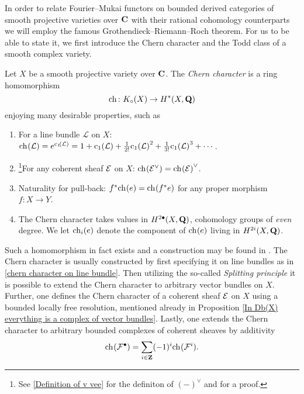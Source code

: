 In order to relate Fourier--Mukai functors on bounded derived categories of smooth projective varieties over $\mathbf C$ with their rational cohomology counterparts we will employ the famous Grothendieck--Riemann--Roch theorem. For us to be able to state it, we first introduce the Chern character and the Todd class of a smooth complex variety.

\begin{definition}
    \label{Definition of Chern character}
    Let $X$ be a smooth projective variety over $\mathbf C$. The \emph{Chern character} is a ring homomorphism
    \[
        \ch[] \colon \kgroup{X} \to \cohom{*}{X}{\Q}
    \] 
    enjoying many desirable properties, such as
    \begin{enumerate}[label = (\roman*)]
        \item{For a line bundle $\mathcal L$ on $X$: $\ch[](\mathcal L) = e^{\cclass[1]{\mathcal L}} = 1 + \cclass[1]{\mathcal L} + \frac{1}{2!}\cclass[1]{\mathcal L}^2 + \frac{1}{3!}\cclass[1]{\mathcal L}^3 + \cdots$.
        } \label{chern character on line bundle}
        \item{\footnote{
            See \ref{Definition of v vee} for the definiton of $(-)^\vee$ and \cite[Lemma C.7]{vanBree2020} for a proof.
        }For any coherent sheaf $\mathcal E$ on $X$: $\ch[]{\E^\vee} = \ch[]{\E}^\vee$.} \label{chern character and dual}
        \item{Naturality for pull-back: $f^*\ch[]{e} = \ch[]{f^*e}$ for any proper morphism $f \colon X \to Y$.}
        \item{The Chern character takes values in $H^{2\bullet}(X, \mathbf Q)$, \ie cohomology groups of \emph{even} degree. We let $\ch[i](e)$ denote the component of $\ch[]{e}$ living in $H^{2i}(X, \mathbf Q)$.}
    \end{enumerate} 
\end{definition}

\begin{remark}
    Such a homomorphism in fact exists and a construction may be found in \cite[\S 3.2]{Fulton1998}. The Chern character is usually constructed by first specifying it on line bundles as in \ref{chern character on line bundle}. Then utilizing the so-called \emph{Splitting principle} \cite[\S 3.2, Remark 3.2.3]{Fulton1998} it is possible to extend the Chern character to arbitrary vector bundles on $X$. Further, one defines the Chern character of a coherent sheaf $\mathcal E$ on $X$ using a bounded locally free resolution, mentioned already in Proposition \ref{In Db(X) everything is a complex of vector bundles}. Lastly, one extends the Chern character to arbitrary bounded complexes of coherent sheaves by additivity \ie
    \[
        \ch[](\F^\bullet) = \sum_{i \in \Z}(-1)^i\ch[](\F^i).
    \] 
\end{remark}

